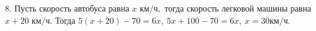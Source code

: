 8. Пусть скорость автобуса равна $x\text{ км/ч},$ тогда скорость легковой машины равна $x+20\text{ км/ч}.$ Тогда $5(x+20)-70=6x,\ 5x+100-70=6x,\ x=30\text{км/ч}.$\\
